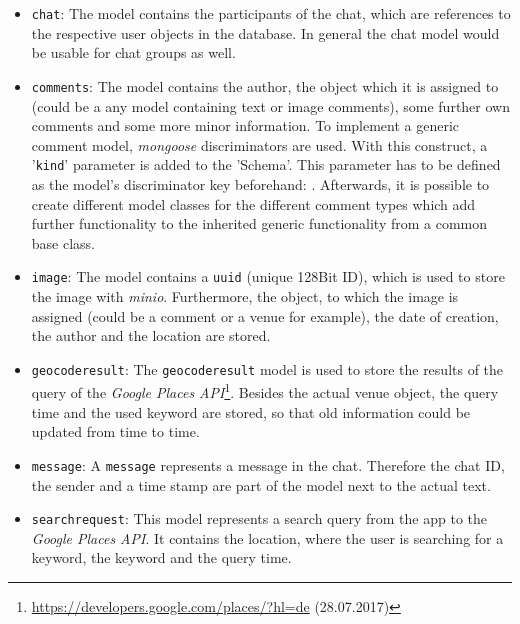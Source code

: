 \begin{itemize}
	\item \texttt{chat}: The model contains the participants of the chat, which are references to the respective user objects in the database. In general the chat model would be usable for chat groups as well.
	\item \texttt{comments}: The model contains the author, the object which it is assigned to (could be a any model containing text or image comments), some further own comments and some more minor information.  To implement a generic comment model, \textit{mongoose} discriminators are used. With this construct, a '\texttt{kind}' parameter is added to the 'Schema'. This parameter has to be defined as the model's discriminator key beforehand: %
	. Afterwards, it is possible to create different model classes for the different comment types which add further functionality to the inherited generic functionality from a common base class.
	\item \texttt{image}: The model contains a \texttt{uuid} (unique 128Bit ID), which is used to store the image with \textit{minio}. Furthermore, the object, to which the image is assigned (could be a comment or a venue for example), the date of creation, the author and the location are stored.
	\item \texttt{geocoderesult}: The \texttt{geocoderesult} model is used to store the results of the query of the \textit{Google Places API}\footnote{\url{https://developers.google.com/places/?hl=de} (28.07.2017)}. Besides the actual venue object, the query time and the used keyword are stored, so that old information could be updated from time to time.
	\item \texttt{message}: A \texttt{message} represents a message in the chat. Therefore the chat ID, the sender and a time stamp are part of the model next to the actual text. 
	\item \texttt{searchrequest}: This model represents a search query from the app to the \textit{Google Places API}. It contains the location, where the user is searching for a keyword, the keyword and the query time.

\end{itemize}
